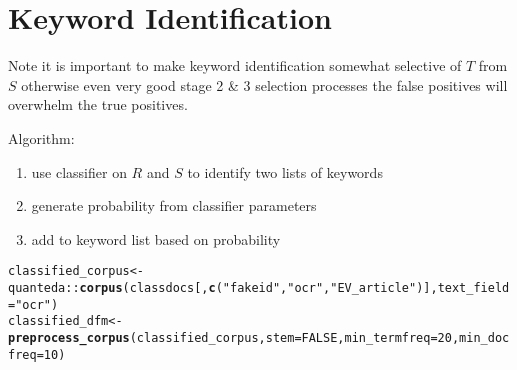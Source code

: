 \documentclass{article}\usepackage[]{graphicx}\usepackage[]{color}
\makeatletter
\newcommand{\hlnum}[1]{\textcolor[rgb]{0.686,0.059,0.569}{#1}}%
\newcommand{\hlstr}[1]{\textcolor[rgb]{0.192,0.494,0.8}{#1}}%
\newcommand{\hlopt}[1]{\textcolor[rgb]{0,0,0}{#1}}%
\newcommand{\hlstd}[1]{\textcolor[rgb]{0.345,0.345,0.345}{#1}}%
\newcommand{\hlkwb}[1]{\textcolor[rgb]{0.69,0.353,0.396}{#1}}%
\newcommand{\hlkwc}[1]{\textcolor[rgb]{0.333,0.667,0.333}{#1}}%
\newcommand{\hlkwd}[1]{\textcolor[rgb]{0.737,0.353,0.396}{\textbf{#1}}}%
\newenvironment{kframe}{%
 \def\at@end@of@kframe{}%
 \ifinner\ifhmode%
  \def\at@end@of@kframe{\end{minipage}}%
  \begin{minipage}{\columnwidth}%
 \fi\fi%
 \def\FrameCommand##1{\hskip\@totalleftmargin \hskip-\fboxsep
 \colorbox{shadecolor}{##1}\hskip-\fboxsep
     \hskip-\linewidth \hskip-\@totalleftmargin \hskip\columnwidth}%
 \MakeFramed {\advance\hsize-\width
   \@totalleftmargin\z@ \linewidth\hsize
   \@setminipage}}%
 {\par\unskip\endMakeFramed%
 \at@end@of@kframe}
\newenvironment{knitrout}{}{} %
\makeatother
\begin{document}
\section{Keyword Identification}
Note it is important to make keyword identification somewhat selective of $T$ from $S$ otherwise even very good stage 2 \& 3 selection processes the false positives will overwhelm the true positives.

Algorithm:
\begin{enumerate}
  \item use classifier on $R$ and $S$ to identify two lists of keywords
  \item generate probability from classifier parameters
  \item add to keyword list based on probability
\end{enumerate}
\begin{knitrout}
\color{fgcolor}\begin{kframe}
\begin{alltt}
\hlstd{classified_corpus}\hlkwb{<-}\hlstd{quanteda}\hlopt{::}\hlkwd{corpus}\hlstd{(classdocs[,}\hlkwd{c}\hlstd{(}\hlstr{"fakeid"}\hlstd{,} \hlstr{"ocr"}\hlstd{,} \hlstr{"EV_article"}\hlstd{)],} \hlkwc{text_field} \hlstd{=} \hlstr{"ocr"}\hlstd{)}
\hlstd{classified_dfm} \hlkwb{<-} \hlkwd{preprocess_corpus}\hlstd{(classified_corpus,} \hlkwc{stem}\hlstd{=}\hlnum{FALSE}\hlstd{,} \hlkwc{min_termfreq}\hlstd{=}\hlnum{20}\hlstd{,} \hlkwc{min_docfreq} \hlstd{=} \hlnum{10}\hlstd{)}


\end{alltt}
\end{kframe}
\end{knitrout}
\end{document}
